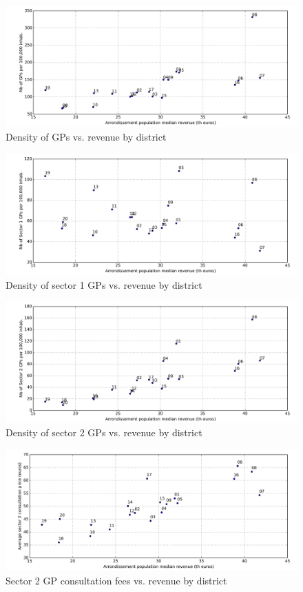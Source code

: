\documentclass[11pt]{article}
\begin{document}
\begin{figure}[H]
    \caption{Density of GPs vs. revenue by district}
	\centering
		\includegraphics[width=16cm]{images/GP_Ardt_DensityVsRevenue.png}
\end{figure}

\begin{figure}[H]
    \caption{Density of sector 1 GPs vs. revenue by district}
	\centering
		\includegraphics[width=16cm]{images/GP_Ardt_DensityS1VsRevenue.png}
\end{figure}

\begin{figure}[H]
    \caption{Density of sector 2 GPs vs. revenue by district}
	\centering
		\includegraphics[width=16cm]{images/GP_Ardt_DensityS2VsRevenue.png}
\end{figure}

\begin{figure}[H]
    \caption{Sector 2 GP consultation fees vs. revenue by district}
	\centering
		\includegraphics[width=16cm]{images/GP_Ardt_ConsultationS2VsRevenue.png}
\end{figure}
\end{document}
